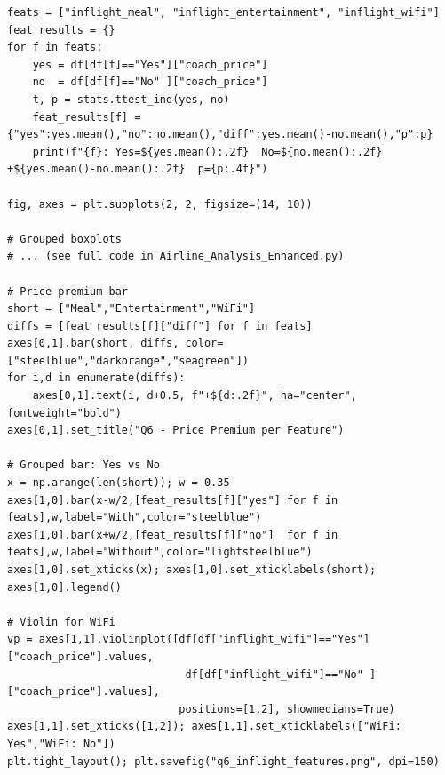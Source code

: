 \documentclass[12pt, a4paper]{report}
\begin{document}
\begin{lstlisting}[style=python, caption={Python — Independent t-tests for each in-flight feature}]
feats = ["inflight_meal", "inflight_entertainment", "inflight_wifi"]
feat_results = {}
for f in feats:
    yes = df[df[f]=="Yes"]["coach_price"]
    no  = df[df[f]=="No" ]["coach_price"]
    t, p = stats.ttest_ind(yes, no)
    feat_results[f] = {"yes":yes.mean(),"no":no.mean(),"diff":yes.mean()-no.mean(),"p":p}
    print(f"{f}: Yes=${yes.mean():.2f}  No=${no.mean():.2f}  +${yes.mean()-no.mean():.2f}  p={p:.4f}")

fig, axes = plt.subplots(2, 2, figsize=(14, 10))

# Grouped boxplots
# ... (see full code in Airline_Analysis_Enhanced.py)

# Price premium bar
short = ["Meal","Entertainment","WiFi"]
diffs = [feat_results[f]["diff"] for f in feats]
axes[0,1].bar(short, diffs, color=["steelblue","darkorange","seagreen"])
for i,d in enumerate(diffs):
    axes[0,1].text(i, d+0.5, f"+${d:.2f}", ha="center", fontweight="bold")
axes[0,1].set_title("Q6 - Price Premium per Feature")

# Grouped bar: Yes vs No
x = np.arange(len(short)); w = 0.35
axes[1,0].bar(x-w/2,[feat_results[f]["yes"] for f in feats],w,label="With",color="steelblue")
axes[1,0].bar(x+w/2,[feat_results[f]["no"]  for f in feats],w,label="Without",color="lightsteelblue")
axes[1,0].set_xticks(x); axes[1,0].set_xticklabels(short); axes[1,0].legend()

# Violin for WiFi
vp = axes[1,1].violinplot([df[df["inflight_wifi"]=="Yes"]["coach_price"].values,
                            df[df["inflight_wifi"]=="No" ]["coach_price"].values],
                           positions=[1,2], showmedians=True)
axes[1,1].set_xticks([1,2]); axes[1,1].set_xticklabels(["WiFi: Yes","WiFi: No"])
plt.tight_layout(); plt.savefig("q6_inflight_features.png", dpi=150)
\end{lstlisting}
\end{document}
